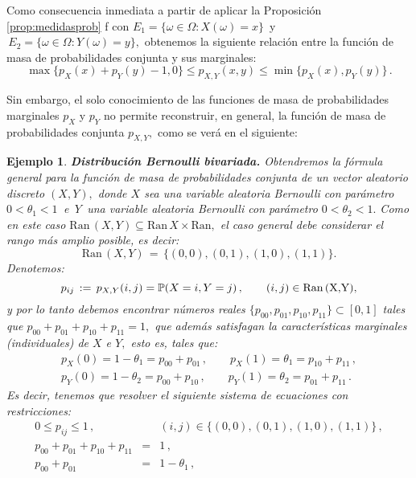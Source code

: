 \documentclass[spanish,10pt,letterpaper]{article}
\newtheorem{ejem}{Ejemplo}
\newcommand{\prob}{\mathbb{P}}
\begin{document}
Como consecuencia inmediata a partir de aplicar la Proposición \ref{prop:medidasprob} f con $E_1=\{\omega\in\Omega:X(\omega)=x\}\,$ y $\,E_2=\{\omega\in\Omega:Y(\omega)=y\},$ obtenemos la siguiente relación entre la función de masa de probabilidades conjunta y sus marginales:
\begin{equation}\label{eq:FHdiscreta}
    \max\{p_X(x)+p_Y(y)-1,0\}\leq p_{X,Y}(x,y)\leq\min\{p_X(x),p_Y(y)\}\,.
\end{equation}

Sin embargo, el solo conocimiento de las funciones de masa de probabilidades marginales $p_X$ y $p_Y$ no permite reconstruir, en general, la función de masa de probabilidades conjunta $p_{X,Y},$ como se verá en el siguiente:

\bigskip

\begin{ejem}\label{ej:BernoulliBiv2}
   \textbf{Distribución Bernoulli bivariada.} Obtendremos la fórmula general para la función de masa de probabilidades conjunta de un vector aleatorio discreto $(X,Y),$ donde $X$ sea una variable aleatoria Bernoulli con parámetro $0<\theta_1<1\,$ e $\,Y\,$ una variable aleatoria Bernoulli con parámetro $0<\theta_2<1.$ Como en este caso $\text{Ran}\,(X,Y)\subseteq\text{Ran}\,X\times\text{Ran},$ el caso general debe considerar el rango más amplio posible, es decir:
   $$\text{Ran}\,(X,Y)\,=\,\{(0,0),(0,1),(1,0),(1,1)\}.$$
   Denotemos: $$p_{ij}\,:=\,p_{X,Y}(i,j)=\prob(X=i,Y=j)\,,\qquad (i,j)\in\text{Ran\,(X,Y)},$$
   y por lo tanto debemos encontrar números reales $\{p_{00},p_{01},p_{10},p_{11}\}\subset[0,1]$ tales que $p_{00}+p_{01}+p_{10}+p_{11}=1,$ que además satisfagan la características marginales (individuales) de $X$ e $Y,$ esto es, tales que:
   \begin{align*}
       p_X(0) = 1 - \theta_1 = p_{00} + p_{01}\,,\qquad p_X(1) = \theta_1 = p_{10} + p_{11}\,, \\
       p_Y(0) = 1 - \theta_2 = p_{00} + p_{10}\,,\qquad p_Y(1) = \theta_2 = p_{01} + p_{11}\,.
   \end{align*}
   Es decir, tenemos que resolver el siguiente sistema de ecuaciones con restricciones:
   \begin{eqnarray}
       0 \leq p_{ij} \leq 1\,, &{ }& (i,j) \in \{(0,0),(0,1),(1,0),(1,1)\}\,, \label{e1} \\
       p_{00} + p_{01} + p_{10} + p_{11} &=& 1\,, \label{e2} \\
       p_{00} + p_{01} &=& 1 -\theta_1\,, \label{e3}\\

\end{eqnarray}
\end{ejem}
\end{document}
